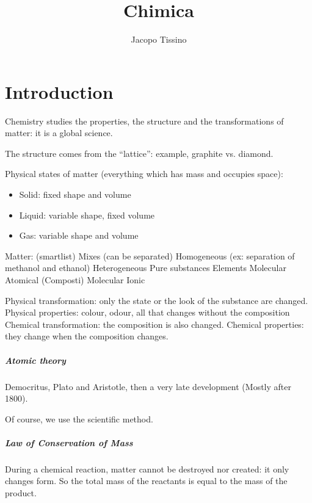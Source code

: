 \documentclass[12pt,a4paper]{report}
\author{Jacopo Tissino}
\title{Chimica}
\numberwithin{equation}{section}
\theoremstyle{definition}
\theoremstyle{remark}
\begin{document}
\maketitle

\chapter{Introduction}

Chemistry studies the properties, the structure and the transformations of matter: it is a global science.

The structure comes from the ``lattice'': example, graphite vs. diamond.

Physical states of matter (everything which has mass and occupies space):

\begin{itemize}
\item Solid: fixed shape and volume
\item Liquid: variable shape, fixed volume
\item Gas: variable shape and volume
\end{itemize}

Matter: (smartlist)
    Mixes (can be separated)
        Homogeneous (ex: separation of methanol and ethanol)
        Heterogeneous
    Pure substances
        Elements
            Molecular
            Atomical
        (Composti)
            Molecular
            Ionic

Physical transformation: only the state or the look of the substance are changed.
Physical properties: colour, odour, all that changes without the composition
Chemical transformation: the composition is also changed.
Chemical properties: they change when the composition changes.

\paragraph{Atomic theory} Democritus, Plato and Aristotle, then a very late development (Mostly after 1800).

Of course, we use the scientific method.

\paragraph{Law of Conservation of Mass} During a chemical reaction, matter cannot be destroyed nor created: it only changes form. So the total mass of the reactants is equal to the mass of the product.

\tableofcontents
\end{document}
